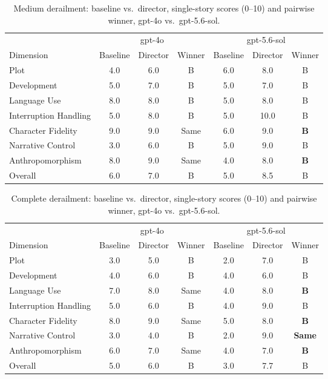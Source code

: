 \documentclass[10pt]{article}
\begin{document}
\begin{table}[htbp]
\centering
\caption{Medium derailment: baseline vs.\ director, single-story scores (0--10) and pairwise winner, gpt-4o vs.\ gpt-5.6-sol.}
\label{tab:judge-cmp-medium}
\small
\begin{tabular}{lcccccc}
\toprule
 & \multicolumn{3}{c}{gpt-4o} & \multicolumn{3}{c}{gpt-5.6-sol} \\
\cmidrule(lr){2-4} \cmidrule(lr){5-7}
Dimension & Baseline & Director & Winner & Baseline & Director & Winner \\
\midrule
Plot                   & 4.0 & 6.0 & B    & 6.0 & 8.0  & B \\
Development             & 5.0 & 7.0 & B    & 5.0 & 7.0  & B \\
Language Use            & 8.0 & 8.0 & B    & 5.0 & 8.0  & B \\
Interruption Handling   & 5.0 & 8.0 & B    & 5.0 & 10.0 & B \\
Character Fidelity      & 9.0 & 9.0 & Same & 6.0 & 9.0  & \textbf{B} \\
Narrative Control       & 3.0 & 6.0 & B    & 5.0 & 9.0  & B \\
Anthropomorphism        & 8.0 & 9.0 & Same & 4.0 & 8.0  & \textbf{B} \\
Overall                  & 6.0 & 7.0 & B    & 5.0 & 8.5  & B \\
\bottomrule
\end{tabular}
\end{table}

\begin{table}[htbp]
\centering
\caption{Complete derailment: baseline vs.\ director, single-story scores (0--10) and pairwise winner, gpt-4o vs.\ gpt-5.6-sol.}
\label{tab:judge-cmp-complete}
\small
\begin{tabular}{lcccccc}
\toprule
 & \multicolumn{3}{c}{gpt-4o} & \multicolumn{3}{c}{gpt-5.6-sol} \\
\cmidrule(lr){2-4} \cmidrule(lr){5-7}
Dimension & Baseline & Director & Winner & Baseline & Director & Winner \\
\midrule
Plot                   & 3.0 & 5.0 & B    & 2.0 & 7.0 & B \\
Development             & 4.0 & 6.0 & B    & 4.0 & 6.0 & B \\
Language Use            & 7.0 & 8.0 & Same & 4.0 & 8.0 & \textbf{B} \\
Interruption Handling   & 5.0 & 6.0 & B    & 4.0 & 9.0 & B \\
Character Fidelity      & 8.0 & 9.0 & Same & 5.0 & 8.0 & \textbf{B} \\
Narrative Control       & 3.0 & 4.0 & B    & 2.0 & 9.0 & \textbf{Same} \\
Anthropomorphism        & 6.0 & 7.0 & Same & 4.0 & 7.0 & \textbf{B} \\
Overall                  & 5.0 & 6.0 & B    & 3.0 & 7.7 & B \\
\bottomrule
\end{tabular}
\end{table}
\end{document}
